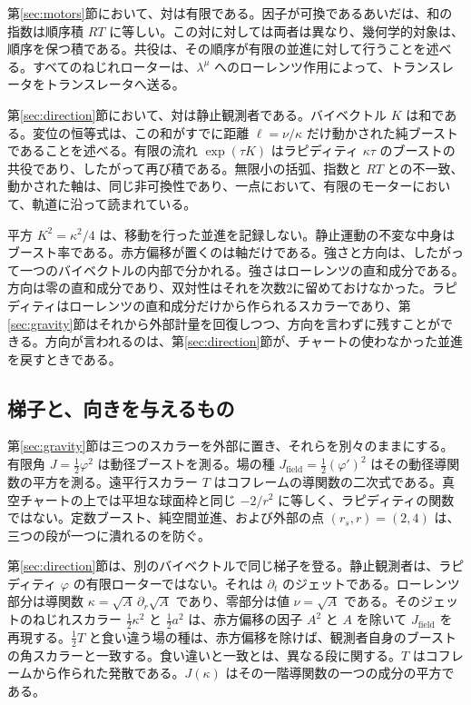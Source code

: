 \documentclass[a4paper]{article}
\begin{document}
第\ref{sec:motors}節において、対は有限である。因子が可換であるあいだは、和の指数は順序積 \(RT\) に等しい。この対に対しては両者は異なり、幾何学的対象は、順序を保つ積である。共役は、その順序が有限の並進に対して行うことを述べる。すべてのねじれローターは、\(\lambda^{\mu}\) へのローレンツ作用によって、トランスレータをトランスレータへ送る。

第\ref{sec:direction}節において、対は静止観測者である。バイベクトル \(K\) は和である。変位の恒等式は、この和がすでに距離 \(\ell=\nu/\kappa\) だけ動かされた純ブーストであることを述べる。有限の流れ \(\exp(\tau K)\) はラピディティ \(\kappa\tau\) のブーストの共役であり、したがって再び積である。無限小の括弧、指数と \(RT\) との不一致、動かされた軸は、同じ非可換性であり、一点において、有限のモーターにおいて、軌道に沿って読まれている。

平方 \(K^{2}=\kappa^{2}/4\) は、移動を行った並進を記録しない。静止運動の不変な中身はブースト率である。赤方偏移が置くのは軸だけである。強さと方向は、したがって一つのバイベクトルの内部で分かれる。強さはローレンツの直和成分である。方向は零の直和成分であり、双対性はそれを次数2に留めておけなかった。ラピディティはローレンツの直和成分だけから作られるスカラーであり、第\ref{sec:gravity}節はそれから外部計量を回復しつつ、方向を言わずに残すことができる。方向が言われるのは、第\ref{sec:direction}節が、チャートの使わなかった並進を戻すときである。

\subsection{梯子と、向きを与えるもの}

第\ref{sec:gravity}節は三つのスカラーを外部に置き、それらを別々のままにする。有限角 \(J=\tfrac12\varphi^{2}\) は動径ブーストを測る。場の種 \(J_{\mathrm{field}}=\tfrac12(\varphi')^{2}\) はその動径導関数の平方を測る。遠平行スカラー \(T\) はコフレームの導関数の二次式である。真空チャートの上では平坦な球面枠と同じ \(-2/r^{2}\) に等しく、ラピディティの関数ではない。定数ブースト、純空間並進、および外部の点 \((r_{s},r)=(2,4)\) は、三つの段が一つに潰れるのを防ぐ。

第\ref{sec:direction}節は、別のバイベクトルで同じ梯子を登る。静止観測者は、ラピディティ \(\varphi\) の有限ローターではない。それは \(\partial_{t}\) のジェットである。ローレンツ部分は導関数 \(\kappa=\sqrt{A}\,\partial_{r}\sqrt{A}\) であり、零部分は値 \(\nu=\sqrt{A}\) である。そのジェットのねじれスカラー \(\tfrac12\kappa^{2}\) と \(\tfrac12 a^{2}\) は、赤方偏移の因子 \(A^{2}\) と \(A\) を除いて \(J_{\mathrm{field}}\) を再現する。\(\tfrac12 T\) と食い違う場の種は、赤方偏移を除けば、観測者自身のブーストの角スカラーと一致する。食い違いと一致とは、異なる段に関する。\(T\) はコフレームから作られた発散である。\(J(\kappa)\) はその一階導関数の一つの成分の平方である。
\end{document}
